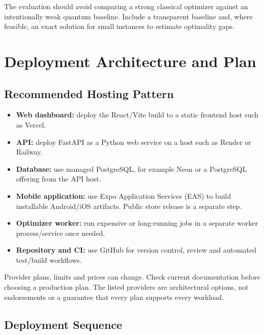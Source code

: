 \documentclass[11pt,a4paper]{article}
\begin{document}
The evaluation should avoid comparing a strong classical optimizer against an intentionally weak quantum baseline. Include a transparent baseline and, where feasible, an exact solution for small instances to estimate optimality gaps.

\section{Deployment Architecture and Plan}

\subsection{Recommended Hosting Pattern}

\begin{itemize}
  \item \textbf{Web dashboard:} deploy the React/Vite build to a static frontend host such as Vercel.
  \item \textbf{API:} deploy FastAPI as a Python web service on a host such as Render or Railway.
  \item \textbf{Database:} use managed PostgreSQL, for example Neon or a PostgreSQL offering from the API host.
  \item \textbf{Mobile application:} use Expo Application Services (EAS) to build installable Android/iOS artifacts. Public store release is a separate step.
  \item \textbf{Optimizer worker:} run expensive or long-running jobs in a separate worker process/service once needed.
  \item \textbf{Repository and CI:} use GitHub for version control, review and automated test/build workflows.
\end{itemize}

Provider plans, limits and prices can change. Check current documentation before choosing a production plan. The listed providers are architectural options, not endorsements or a guarantee that every plan supports every workload.

\subsection{Deployment Sequence}
\end{document}
